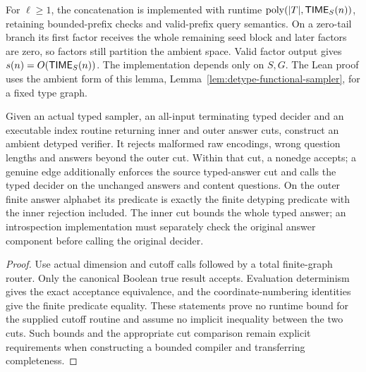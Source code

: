 \begin{lemma}
\label{lem:detype-sampler}
For $\ell\geq1$, the concatenation is implemented with runtime
$\mathrm{poly}(|T|,\mathsf{TIME}_S(n))$, retaining bounded-prefix checks and valid-prefix
query semantics. On a zero-tail branch its first factor receives the whole
remaining seed block and later factors are zero, so factors still partition
the ambient space. Valid factor output gives $s(n)=O(\mathsf{TIME}_S(n))$.
The implementation depends only on $S,G$.
The Lean proof uses the ambient form of this lemma, Lemma~\ref{lem:detype-functional-sampler},
for a fixed type graph.
\end{lemma}

\begin{lemma}
\label{lem:detype-executable-decider}
\leanok
Given an actual typed sampler, an all-input terminating typed decider and an
executable index routine returning inner and outer answer cuts, construct an
ambient detyped verifier. It rejects malformed raw encodings, wrong question
lengths and answers beyond the outer cut. Within that cut, a nonedge accepts;
a genuine edge additionally enforces the source typed-answer cut and calls
the typed decider on the unchanged answers and content questions. On the
outer finite answer alphabet its predicate is exactly the finite detyping
predicate with the inner rejection included. The inner cut bounds the whole
typed answer; an introspection implementation must separately check the
original answer component before calling the original decider.
\end{lemma}
\begin{proof}
\leanok
Use actual dimension and cutoff calls followed by a total finite-graph router.
Only the canonical Boolean true result accepts. Evaluation determinism gives
the exact acceptance equivalence, and the coordinate-numbering identities
give the finite predicate equality. These statements prove no runtime bound
for the supplied cutoff routine and assume no implicit inequality between
the two cuts. Such bounds and the appropriate cut comparison remain explicit
requirements when constructing a bounded compiler and transferring completeness.
\end{proof}

